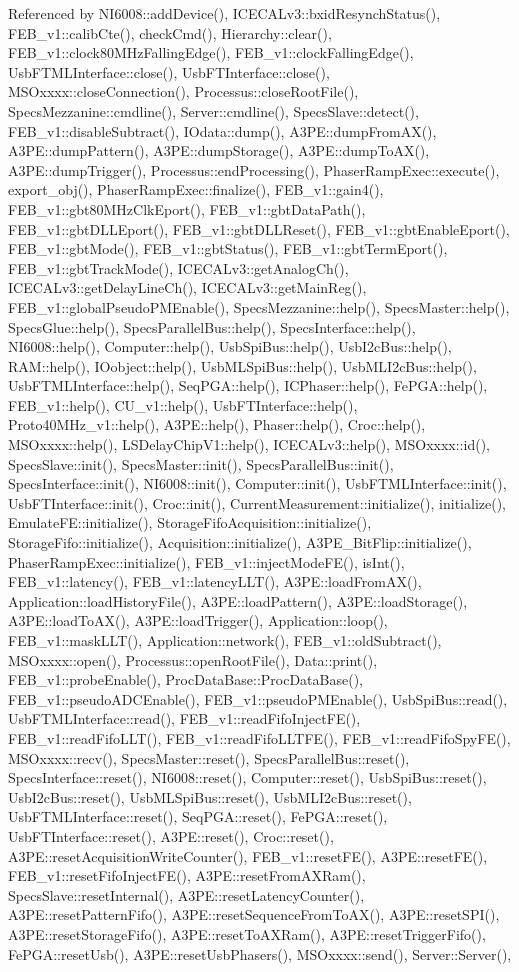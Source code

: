 Referenced by NI6008::addDevice(), ICECALv3::bxidResynchStatus(), FEB\_\-v1::calibCte(), checkCmd(), Hierarchy::clear(), FEB\_\-v1::clock80MHzFallingEdge(), FEB\_\-v1::clockFallingEdge(), UsbFTMLInterface::close(), UsbFTInterface::close(), MSOxxxx::closeConnection(), Processus::closeRootFile(), SpecsMezzanine::cmdline(), Server::cmdline(), SpecsSlave::detect(), FEB\_\-v1::disableSubtract(), IOdata::dump(), A3PE::dumpFromAX(), A3PE::dumpPattern(), A3PE::dumpStorage(), A3PE::dumpToAX(), A3PE::dumpTrigger(), Processus::endProcessing(), PhaserRampExec::execute(), export\_\-obj(), PhaserRampExec::finalize(), FEB\_\-v1::gain4(), FEB\_\-v1::gbt80MHzClkEport(), FEB\_\-v1::gbtDataPath(), FEB\_\-v1::gbtDLLEport(), FEB\_\-v1::gbtDLLReset(), FEB\_\-v1::gbtEnableEport(), FEB\_\-v1::gbtMode(), FEB\_\-v1::gbtStatus(), FEB\_\-v1::gbtTermEport(), FEB\_\-v1::gbtTrackMode(), ICECALv3::getAnalogCh(), ICECALv3::getDelayLineCh(), ICECALv3::getMainReg(), FEB\_\-v1::globalPseudoPMEnable(), SpecsMezzanine::help(), SpecsMaster::help(), SpecsGlue::help(), SpecsParallelBus::help(), SpecsInterface::help(), NI6008::help(), Computer::help(), UsbSpiBus::help(), UsbI2cBus::help(), RAM::help(), IOobject::help(), UsbMLSpiBus::help(), UsbMLI2cBus::help(), UsbFTMLInterface::help(), SeqPGA::help(), ICPhaser::help(), FePGA::help(), FEB\_\-v1::help(), CU\_\-v1::help(), UsbFTInterface::help(), Proto40MHz\_\-v1::help(), A3PE::help(), Phaser::help(), Croc::help(), MSOxxxx::help(), LSDelayChipV1::help(), ICECALv3::help(), MSOxxxx::id(), SpecsSlave::init(), SpecsMaster::init(), SpecsParallelBus::init(), SpecsInterface::init(), NI6008::init(), Computer::init(), UsbFTMLInterface::init(), UsbFTInterface::init(), Croc::init(), CurrentMeasurement::initialize(), initialize(), EmulateFE::initialize(), StorageFifoAcquisition::initialize(), StorageFifo::initialize(), Acquisition::initialize(), A3PE\_\-BitFlip::initialize(), PhaserRampExec::initialize(), FEB\_\-v1::injectModeFE(), isInt(), FEB\_\-v1::latency(), FEB\_\-v1::latencyLLT(), A3PE::loadFromAX(), Application::loadHistoryFile(), A3PE::loadPattern(), A3PE::loadStorage(), A3PE::loadToAX(), A3PE::loadTrigger(), Application::loop(), FEB\_\-v1::maskLLT(), Application::network(), FEB\_\-v1::oldSubtract(), MSOxxxx::open(), Processus::openRootFile(), Data::print(), FEB\_\-v1::probeEnable(), ProcDataBase::ProcDataBase(), FEB\_\-v1::pseudoADCEnable(), FEB\_\-v1::pseudoPMEnable(), UsbSpiBus::read(), UsbFTMLInterface::read(), FEB\_\-v1::readFifoInjectFE(), FEB\_\-v1::readFifoLLT(), FEB\_\-v1::readFifoLLTFE(), FEB\_\-v1::readFifoSpyFE(), MSOxxxx::recv(), SpecsMaster::reset(), SpecsParallelBus::reset(), SpecsInterface::reset(), NI6008::reset(), Computer::reset(), UsbSpiBus::reset(), UsbI2cBus::reset(), UsbMLSpiBus::reset(), UsbMLI2cBus::reset(), UsbFTMLInterface::reset(), SeqPGA::reset(), FePGA::reset(), UsbFTInterface::reset(), A3PE::reset(), Croc::reset(), A3PE::resetAcquisitionWriteCounter(), FEB\_\-v1::resetFE(), A3PE::resetFE(), FEB\_\-v1::resetFifoInjectFE(), A3PE::resetFromAXRam(), SpecsSlave::resetInternal(), A3PE::resetLatencyCounter(), A3PE::resetPatternFifo(), A3PE::resetSequenceFromToAX(), A3PE::resetSPI(), A3PE::resetStorageFifo(), A3PE::resetToAXRam(), A3PE::resetTriggerFifo(), FePGA::resetUsb(), A3PE::resetUsbPhasers(), MSOxxxx::send(), Server::Server(), 